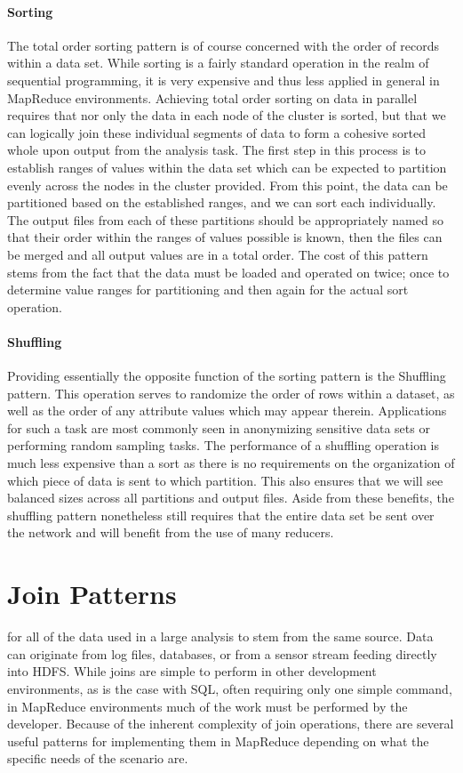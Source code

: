 \paragraph{Sorting}
The total order sorting pattern is of course concerned with the order of records within a data set. While sorting is a fairly standard operation in the realm of sequential programming, it is  very expensive and thus less applied in general in MapReduce environments. Achieving total order sorting on data in parallel requires that nor only the data in each node of the cluster is sorted, but that we can logically join these individual segments of data to form a cohesive sorted whole upon output from the analysis task. The first step in this process is to establish ranges of values within the data set which can be expected to partition evenly across the nodes in the cluster provided. From this point, the data can be partitioned based on the established ranges, and we can sort each individually. The output files from each of these partitions should be appropriately named so that their order within the ranges of values possible is known, then the files can be merged and all output values are in a total order. The cost of this pattern stems from the fact that the data must be loaded and operated on twice; once to determine value ranges for partitioning and then again for the actual sort operation. 

\paragraph{Shuffling}
Providing essentially the opposite function of the sorting pattern is the Shuffling pattern. This operation serves to randomize the order of rows within a dataset, as well as the order of any attribute values which may appear therein. Applications for such a task are most commonly seen in anonymizing sensitive data sets or performing random sampling tasks. The performance of a shuffling operation is much less expensive than a sort as there is no requirements on the organization of which piece of data is sent to which partition. This also ensures that we will see balanced sizes across all partitions and output files. Aside from these benefits, the shuffling pattern nonetheless still requires that the entire data set be sent over the network and will benefit from the  use of many reducers.

\section{Join Patterns}
\label{sec:joins}
 for all of the data used in a large analysis to stem from the same source. Data can originate from log files, databases, or from a sensor stream feeding directly into HDFS. While joins are simple to perform in other development environments, as is the case with SQL, often requiring only one simple command, in MapReduce environments much of the work must be performed by the developer. Because of the inherent complexity of join operations, there are several useful patterns for implementing them in MapReduce depending on what the specific needs of the scenario are. 

